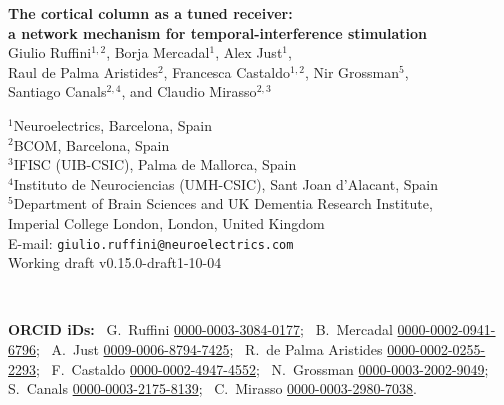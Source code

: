 \documentclass[11pt,a4paper]{article}
\newif\ifjne
\newcommand{\paperver}{0.15.0-draft1} %
\providecommand{\DIFaddtex}[1]{{\protect\color{blue} \sf #1}} %
\providecommand{\DIFaddbegin}{} %
\providecommand{\DIFaddend}{} %
\providecommand{\DIFadd}[1]{\texorpdfstring{\DIFaddtex{#1}}{#1}} %
\begin{document}
\ifjne
\begin{center}
{\LARGE\bfseries The cortical column as a tuned receiver:\\[4pt]
a network mechanism for temporal-interference stimulation}\\[16pt]
{\large Giulio Ruffini$^{1,2}$, Borja Mercadal$^{1}$, Alex Just$^{1}$,\\[2pt]
Raul de Palma Aristides$^{2}$, Francesca Castaldo$^{1,2}$, Nir Grossman$^{5}$,\\[2pt]
Santiago Canals$^{2,4}$, and Claudio Mirasso$^{2,3}$}\\[12pt]
\begin{minipage}{0.86\textwidth}\centering\small
$^{1}$Neuroelectrics, Barcelona, Spain\\
$^{2}$BCOM, Barcelona, Spain\\
$^{3}$IFISC (UIB-CSIC), Palma de Mallorca, Spain\\
$^{4}$Instituto de Neurociencias (UMH-CSIC), Sant Joan d'Alacant, Spain\\
$^{5}$Department of Brain Sciences and UK Dementia Research Institute,\\
Imperial College London, London, United Kingdom\\[6pt]
E-mail: \texttt{giulio.ruffini@neuroelectrics.com}\DIFaddbegin \\[4pt]
\DIFadd{Working draft v\paperver{}-10-04
}\DIFaddend \end{minipage}\\[8pt]
\begin{minipage}{0.86\textwidth}\centering\footnotesize\color{negray}
\textbf{ORCID iDs:}\ %
G.~Ruffini \href{https://orcid.org/0000-0003-3084-0177}{0000-0003-3084-0177};\ %
B.~Mercadal \href{https://orcid.org/0000-0002-0941-6796}{0000-0002-0941-6796};\ %
A.~Just \href{https://orcid.org/0009-0006-8794-7425}{0009-0006-8794-7425};\ %
R.~de Palma Aristides \href{https://orcid.org/0000-0002-0255-2293}{0000-0002-0255-2293};\ %
F.~Castaldo \href{https://orcid.org/0000-0002-4947-4552}{0000-0002-4947-4552};\ %
N.~Grossman \href{https://orcid.org/0000-0003-2002-9049}{0000-0003-2002-9049};\ %
S.~Canals \href{https://orcid.org/0000-0003-2175-8139}{0000-0003-2175-8139};\ %
C.~Mirasso \href{https://orcid.org/0000-0003-2980-7038}{0000-0003-2980-7038}.
\end{minipage}
\end{center}
\end{document}
